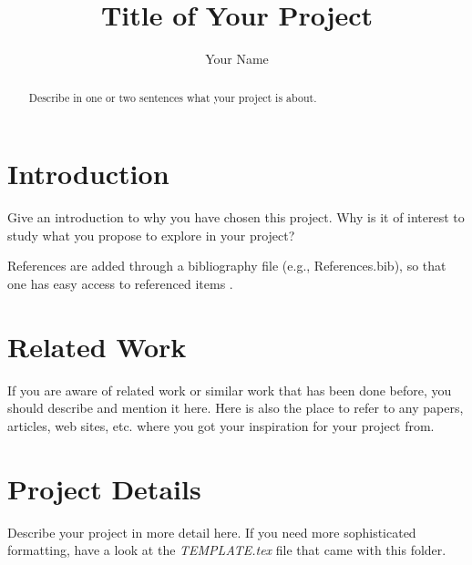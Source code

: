 \documentclass[runningheads]{llncs}
\begin{document}
\title{Title of Your Project}

\author{Your Name  }


\maketitle


\begin{abstract} 
Describe in one or two sentences what your project is about.
\end{abstract}


\section{Introduction}
\label{sec:Introduction}
Give an introduction to why you have chosen this project. Why is it of interest to study what you propose to explore in your project? 

References are added through a bibliography file (e.g., References.bib), so that one has easy access to referenced items \cite{Alon:1999aa}.

\section{Related Work}
If you are aware of related work or similar work that has been done before, you should describe and mention it here. Here is also the place to refer to any papers, articles, web sites, etc. where you got your inspiration for your project from.

\section{Project Details}
Describe your project in more detail here. If you need more sophisticated formatting, have a look at the \emph{TEMPLATE.tex} file that came with this folder.
\end{document}

